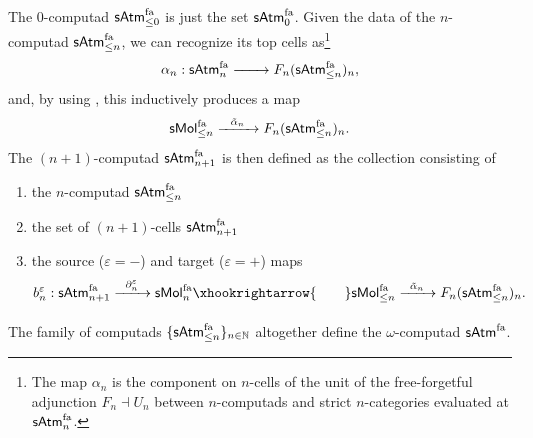 \documentclass[12pt,a4paper]{article}
\numberwithin{equation}{section}
\newcommand{\atm}[2][s]{%
    \ifx b#1\mathsf{Atm}_{#2}\else
    \ifx s#1\mathsf{sAtm}_{#2}\else
    \ifx f#1\mathsf{sAtm}^{\mathrm{fa}}_{#2}\else
    \mathrm{Illegal~option}%
    \fi\fi\fi
}
\newcommand{\mol}[2][s]{%
    \ifx b#1\mathsf{Mol}_{#2}\else
    \ifx s#1\mathsf{sMol}_{#2}\else
    \ifx f#1\mathsf{sMol}^{\mathrm{fa}}_{#2}\else
    \mathrm{Illegal~option}%
    \fi\fi\fi
}
\begin{document}
\begin{definition}\label{def:satm_computad}
    The 0-computad $\atm[f]{\leq 0}$ is just the set $\atm[f]{0}$. Given the data of the $n$-computad $\atm[f]{\leq n}$, we can recognize its top cells as\footnote{The map $\alpha_n$ is the component on $n$-cells of the unit of the free-forgetful adjunction $F_n \dashv U_n$ between $n$-computads and strict $n$-categories evaluated at $\atm[f]{n}$.}
    \begin{equation}
        \alpha_n: \atm[f]{n} \xrightarrow{\qquad} F_n (\atm[f]{\leq n})_n,
    \end{equation}
    and, by using , this inductively produces a map
    \begin{equation}
        \mol[f]{\leq n} \xrightarrow{\ \ \tilde{\alpha}_n \ \ } F_n (\atm[f]{\leq n})_n.
    \end{equation}
    The $(n+1)$-computad $\atm[f]{n+1}$ is then defined as the collection consisting of
    \begin{enumerate}
        \item the $n$-computad $\atm[f]{\leq n}$
        \item the set of $(n+1)$-cells $\atm[f]{n+1}$
        \item the source ($\varepsilon=-$) and target ($\varepsilon=+$) maps
        \begin{equation}
            b^{\varepsilon}_n: \atm[f]{n+1} \xrightarrow[\qquad]{\partial^{\varepsilon}_n} \mol[f]{n} \xhookrightarrow{\qquad} \mol[f]{\leq n} \xrightarrow[\qquad]{\tilde{\alpha}_n} F_n (\atm[f]{\leq n})_n.
        \end{equation}
    \end{enumerate}
    The family of computads $\{\atm[f]{\leq n}\}_{n \in \mathbb{N}}$ altogether define the $\omega$-computad $\atm[f]{}$.
\end{definition}
\end{document}
